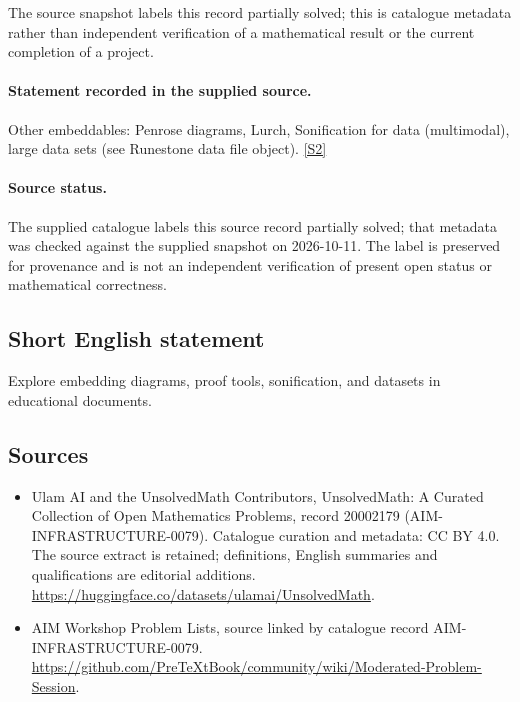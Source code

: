 \documentclass[11pt]{article}
\begin{document}
The source snapshot labels this record partially solved; this is catalogue metadata rather than independent verification of a mathematical result or the current completion of a project.
\paragraph{Statement recorded in the supplied source.}
Other embeddables: Penrose diagrams, Lurch, Sonification for data (multimodal), large data sets (see Runestone data file object). \href{https://github.com/PreTeXtBook/community/wiki/Moderated-Problem-Session}{[S2]}
\paragraph{Source status.}
The supplied catalogue labels this source record partially solved; that metadata was checked against the supplied snapshot on 2026-10-11. The label is preserved for provenance and is not an independent verification of present open status or mathematical correctness.
\subsection{Short English statement}
Explore embedding diagrams, proof tools, sonification, and datasets in educational documents.
\subsection{Sources}
\begin{itemize}
\item[S1] Ulam AI and the UnsolvedMath Contributors, UnsolvedMath: A Curated Collection of Open Mathematics Problems, record 20002179 (AIM-INFRASTRUCTURE-0079). Catalogue curation and metadata: CC BY 4.0. The source extract is retained; definitions, English summaries and qualifications are editorial additions.
\url{https://huggingface.co/datasets/ulamai/UnsolvedMath}.
\item[S2] AIM Workshop Problem Lists, source linked by catalogue record AIM-INFRASTRUCTURE-0079.
\url{https://github.com/PreTeXtBook/community/wiki/Moderated-Problem-Session}.
\end{itemize}
\end{document}
